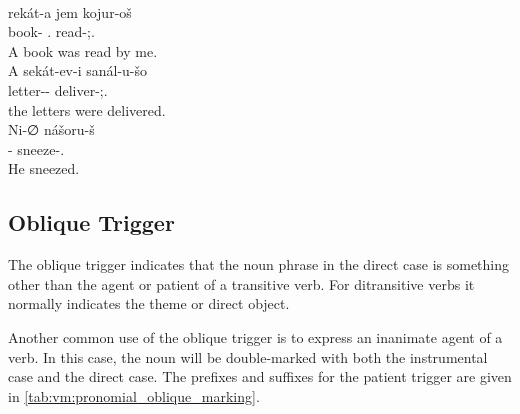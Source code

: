 \documentclass[grammar]{subfiles}
\begin{document}
\begin{exe}
  \ex {}\\
  \gll rekát-a jem kojur-oš\\
  book-{\Dir} {\Fsg}.{\Erg} read\bs{\Perf}-{\Tsg};{\Inan}.{\PatT}\\
  \glt A book was read by me.
  \ex {}\\
  \gll A sekát-ev-i sanál-u-šo\\
  {\Def} letter-{\Du}-{\Dir} deliver\bs{\Perf}-{\Tsg};{\Inan}.{\PatT}\\
  \glt [Both of] the letters were delivered.
  \ex {}\\
  \gll Ni-∅ nášoru-š\\
  {\Tsg}-{\Dir} sneeze\bs{\Perf}-{\Tsg}.{\PatT}\\
  \glt He sneezed.
\end{exe}

\subsection{Oblique Trigger}
\label{ssec:vm:obl_trigger}

The oblique trigger indicates that the noun phrase in the direct case is
something other than the agent or patient of a transitive verb.  For
ditransitive verbs it normally indicates the theme or direct object.

Another common use of the oblique trigger is to express an inanimate agent of a
verb. In this case, the noun will be double-marked with both the instrumental
case and the direct case.  The prefixes and suffixes for the patient trigger
are given in \cref{tab:vm:pronomial_oblique_marking}.
\end{document}
